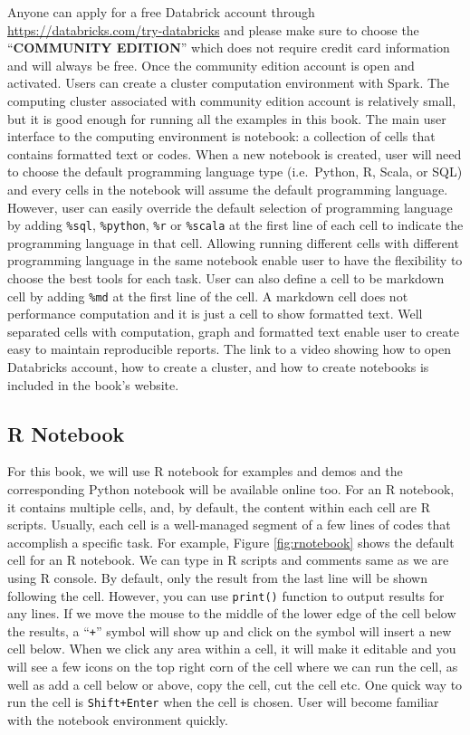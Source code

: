 \documentclass[12pt,]{krantz}
\begin{document}
Anyone can apply for a free Databrick account through \url{https://databricks.com/try-databricks} and please make sure to choose the ``\textbf{COMMUNITY EDITION}'' which does not require credit card information and will always be free. Once the community edition account is open and activated. Users can create a cluster computation environment with Spark. The computing cluster associated with community edition account is relatively small, but it is good enough for running all the examples in this book. The main user interface to the computing environment is notebook: a collection of cells that contains formatted text or codes. When a new notebook is created, user will need to choose the default programming language type (i.e.~Python, R, Scala, or SQL) and every cells in the notebook will assume the default programming language. However, user can easily override the default selection of programming language by adding \texttt{\%sql}, \texttt{\%python}, \texttt{\%r} or \texttt{\%scala} at the first line of each cell to indicate the programming language in that cell. Allowing running different cells with different programming language in the same notebook enable user to have the flexibility to choose the best tools for each task. User can also define a cell to be markdown cell by adding \texttt{\%md} at the first line of the cell. A markdown cell does not performance computation and it is just a cell to show formatted text. Well separated cells with computation, graph and formatted text enable user to create easy to maintain reproducible reports. The link to a video showing how to open Databricks account, how to create a cluster, and how to create notebooks is included in the book's website.

\hypertarget{r-notebook}{%
\subsection{R Notebook}\label{r-notebook}}

For this book, we will use R notebook for examples and demos and the corresponding Python notebook will be available online too. For an R notebook, it contains multiple cells, and, by default, the content within each cell are R scripts. Usually, each cell is a well-managed segment of a few lines of codes that accomplish a specific task. For example, Figure \ref{fig:rnotebook} shows the default cell for an R notebook. We can type in R scripts and comments same as we are using R console. By default, only the result from the last line will be shown following the cell. However, you can use \texttt{print()} function to output results for any lines. If we move the mouse to the middle of the lower edge of the cell below the results, a ``\texttt{+}'' symbol will show up and click on the symbol will insert a new cell below. When we click any area within a cell, it will make it editable and you will see a few icons on the top right corn of the cell where we can run the cell, as well as add a cell below or above, copy the cell, cut the cell etc. One quick way to run the cell is \texttt{Shift+Enter} when the cell is chosen. User will become familiar with the notebook environment quickly.
\end{document}
